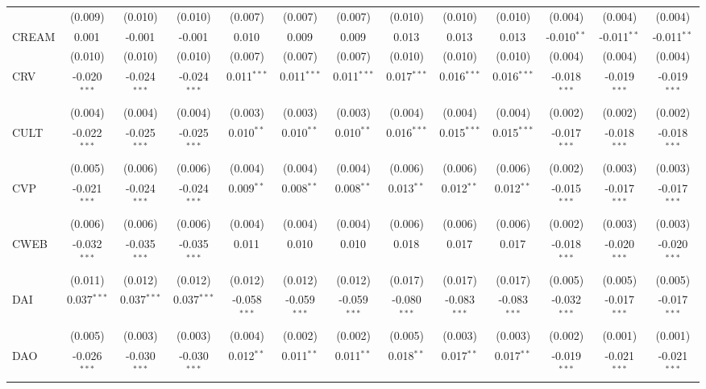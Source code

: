 \begin{table}[!htbp]
\begin{tabular}{@{\extracolsep{5pt}}lcccccccccccc}
  & (0.009) & (0.010) & (0.010) & (0.007) & (0.007) & (0.007) & (0.010) & (0.010) & (0.010) & (0.004) & (0.004) & (0.004) \\
 CREAM & 0.001$^{}$ & -0.001$^{}$ & -0.001$^{}$ & 0.010$^{}$ & 0.009$^{}$ & 0.009$^{}$ & 0.013$^{}$ & 0.013$^{}$ & 0.013$^{}$ & -0.010$^{**}$ & -0.011$^{**}$ & -0.011$^{**}$ \\
  & (0.010) & (0.010) & (0.010) & (0.007) & (0.007) & (0.007) & (0.010) & (0.010) & (0.010) & (0.004) & (0.004) & (0.004) \\
 CRV & -0.020$^{***}$ & -0.024$^{***}$ & -0.024$^{***}$ & 0.011$^{***}$ & 0.011$^{***}$ & 0.011$^{***}$ & 0.017$^{***}$ & 0.016$^{***}$ & 0.016$^{***}$ & -0.018$^{***}$ & -0.019$^{***}$ & -0.019$^{***}$ \\
  & (0.004) & (0.004) & (0.004) & (0.003) & (0.003) & (0.003) & (0.004) & (0.004) & (0.004) & (0.002) & (0.002) & (0.002) \\
 CULT & -0.022$^{***}$ & -0.025$^{***}$ & -0.025$^{***}$ & 0.010$^{**}$ & 0.010$^{**}$ & 0.010$^{**}$ & 0.016$^{***}$ & 0.015$^{***}$ & 0.015$^{***}$ & -0.017$^{***}$ & -0.018$^{***}$ & -0.018$^{***}$ \\
  & (0.005) & (0.006) & (0.006) & (0.004) & (0.004) & (0.004) & (0.006) & (0.006) & (0.006) & (0.002) & (0.003) & (0.003) \\
 CVP & -0.021$^{***}$ & -0.024$^{***}$ & -0.024$^{***}$ & 0.009$^{**}$ & 0.008$^{**}$ & 0.008$^{**}$ & 0.013$^{**}$ & 0.012$^{**}$ & 0.012$^{**}$ & -0.015$^{***}$ & -0.017$^{***}$ & -0.017$^{***}$ \\
  & (0.006) & (0.006) & (0.006) & (0.004) & (0.004) & (0.004) & (0.006) & (0.006) & (0.006) & (0.002) & (0.003) & (0.003) \\
 CWEB & -0.032$^{***}$ & -0.035$^{***}$ & -0.035$^{***}$ & 0.011$^{}$ & 0.010$^{}$ & 0.010$^{}$ & 0.018$^{}$ & 0.017$^{}$ & 0.017$^{}$ & -0.018$^{***}$ & -0.020$^{***}$ & -0.020$^{***}$ \\
  & (0.011) & (0.012) & (0.012) & (0.012) & (0.012) & (0.012) & (0.017) & (0.017) & (0.017) & (0.005) & (0.005) & (0.005) \\
 DAI & 0.037$^{***}$ & 0.037$^{***}$ & 0.037$^{***}$ & -0.058$^{***}$ & -0.059$^{***}$ & -0.059$^{***}$ & -0.080$^{***}$ & -0.083$^{***}$ & -0.083$^{***}$ & -0.032$^{***}$ & -0.017$^{***}$ & -0.017$^{***}$ \\
  & (0.005) & (0.003) & (0.003) & (0.004) & (0.002) & (0.002) & (0.005) & (0.003) & (0.003) & (0.002) & (0.001) & (0.001) \\
 DAO & -0.026$^{***}$ & -0.030$^{***}$ & -0.030$^{***}$ & 0.012$^{**}$ & 0.011$^{**}$ & 0.011$^{**}$ & 0.018$^{**}$ & 0.017$^{**}$ & 0.017$^{**}$ & -0.019$^{***}$ & -0.021$^{***}$ & -0.021$^{***}$ \\

\end{tabular}
\end{table}
